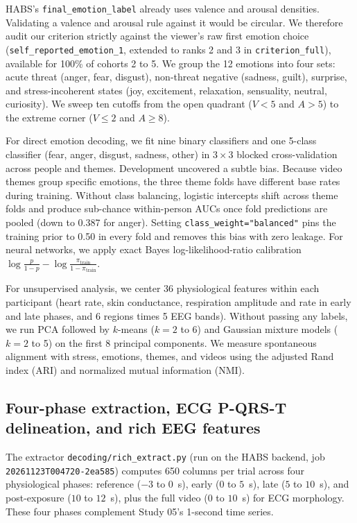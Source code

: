 \documentclass[10pt]{article}
\begin{document}
HABS's \texttt{final\_emotion\_label} already uses valence and arousal densities. Validating a valence and arousal rule against it would be circular. We therefore audit our criterion strictly against the viewer's raw first emotion choice (\texttt{self\_reported\_emotion\_1}, extended to ranks 2 and 3 in \texttt{criterion\_full}), available for 100\% of cohorts 2 to 5. We group the 12 emotions into four sets: acute threat (anger, fear, disgust), non-threat negative (sadness, guilt), surprise, and stress-incoherent states (joy, excitement, relaxation, sensuality, neutral, curiosity). We sweep ten cutoffs from the open quadrant ($V < 5$ and $A > 5$) to the extreme corner ($V \le 2$ and $A \ge 8$).

For direct emotion decoding, we fit nine binary classifiers and one 5-class classifier (fear, anger, disgust, sadness, other) in $3 \times 3$ blocked cross-validation across people and themes. Development uncovered a subtle bias. Because video themes group specific emotions, the three theme folds have different base rates during training. Without class balancing, logistic intercepts shift across theme folds and produce sub-chance within-person AUCs once fold predictions are pooled (down to 0.387 for anger). Setting \texttt{class\_weight="balanced"} pins the training prior to 0.50 in every fold and removes this bias with zero leakage. For neural networks, we apply exact Bayes log-likelihood-ratio calibration $\log\frac{p}{1-p} - \log\frac{\pi_{\text{train}}}{1-\pi_{\text{train}}}$.

For unsupervised analysis, we center 36 physiological features within each participant (heart rate, skin conductance, respiration amplitude and rate in early and late phases, and 6 regions times 5 EEG bands). Without passing any labels, we run PCA followed by $k$-means ($k = 2$ to 6) and Gaussian mixture models ($k = 2$ to 5) on the first 8 principal components. We measure spontaneous alignment with stress, emotions, themes, and videos using the adjusted Rand index (ARI) and normalized mutual information (NMI).

\subsection{Four-phase extraction, ECG P-QRS-T delineation, and rich EEG features}

The extractor \texttt{decoding/\allowbreak rich\_extract.py} (run on the HABS backend, job \texttt{20261123T004720-2ea585}) computes 650 columns per trial across four physiological phases: reference ($-3$ to $0$~s), early ($0$ to $5$~s), late ($5$ to $10$~s), and post-exposure ($10$ to $12$~s), plus the full video ($0$ to $10$~s) for ECG morphology. These four phases complement Study 05's 1-second time series.
\end{document}
